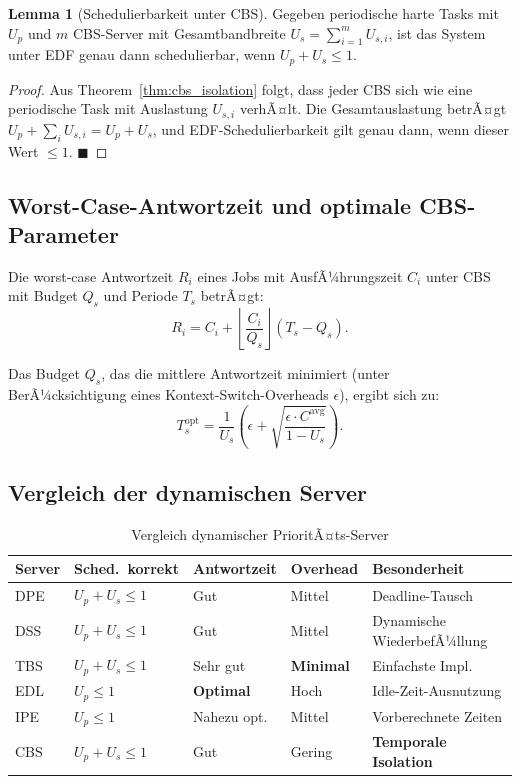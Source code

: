 ﻿\documentclass[a4paper,12pt]{report}
\theoremstyle{definition}
\newtheorem{lemma}{Lemma}[chapter]
\begin{document}
\begin{lemma}[Schedulierbarkeit unter CBS]
	Gegeben periodische harte Tasks mit $U_p$ und $m$ CBS-Server mit Gesamtbandbreite
	$U_s = \sum_{i=1}^m U_{s,i}$, ist das System unter EDF genau dann schedulierbar,
	wenn $U_p + U_s \leq 1$.
\end{lemma}

\begin{proof}
	Aus Theorem~\ref{thm:cbs_isolation} folgt, dass jeder CBS sich wie eine
	periodische Task mit Auslastung $U_{s,i}$ verhÃ¤lt. Die Gesamtauslastung
	betrÃ¤gt $U_p + \sum_i U_{s,i} = U_p + U_s$, und EDF-Schedulierbarkeit
	gilt genau dann, wenn dieser Wert $\leq 1$. \hfill$\blacksquare$
\end{proof}

\subsection{Worst-Case-Antwortzeit und optimale CBS-Parameter}

Die worst-case Antwortzeit $R_i$ eines Jobs mit AusfÃ¼hrungszeit $C_i$ unter CBS mit
Budget $Q_s$ und Periode $T_s$ betrÃ¤gt:
\[
	R_i = C_i + \left\lfloor \frac{C_i}{Q_s} \right\rfloor (T_s - Q_s).
\]

Das Budget $Q_s$, das die mittlere Antwortzeit minimiert (unter BerÃ¼cksichtigung
eines Kontext-Switch-Overheads $\epsilon$), ergibt sich zu:
\[
	T_s^{\mathrm{opt}} = \frac{1}{U_s} \left( \epsilon + \sqrt{\frac{\epsilon \cdot C^{\mathrm{avg}}}{1-U_s}} \right).
\]

\subsection{Vergleich der dynamischen Server}

\begin{table}[H]
	\centering
	\caption{Vergleich dynamischer PrioritÃ¤ts-Server}
	\label{tab:dynserver}
	\begin{tabular}{p{2.5cm}p{2cm}p{2cm}p{2cm}p{3cm}}
		\toprule
		\textbf{Server} & \textbf{Sched.\ korrekt} & \textbf{Antwort\-zeit} & \textbf{Overhead} & \textbf{Besonderheit} \\
		\midrule
		DPE  & $U_p+U_s\leq 1$ & Gut & Mittel & Deadline-Tausch \\
		DSS  & $U_p+U_s\leq 1$ & Gut & Mittel & Dynamische WiederbefÃ¼llung \\
		TBS  & $U_p+U_s\leq 1$ & Sehr gut & \textbf{Minimal} & Einfachste Impl. \\
		EDL  & $U_p \leq 1$ & \textbf{Optimal} & Hoch & Idle-Zeit-Ausnutzung \\
		IPE  & $U_p \leq 1$ & Nahezu opt. & Mittel & Vorberechnete Zeiten \\
		CBS  & $U_p+U_s\leq 1$ & Gut & Gering & \textbf{Temporale Isolation} \\
		\bottomrule
	\end{tabular}
\end{table}
\end{document}
